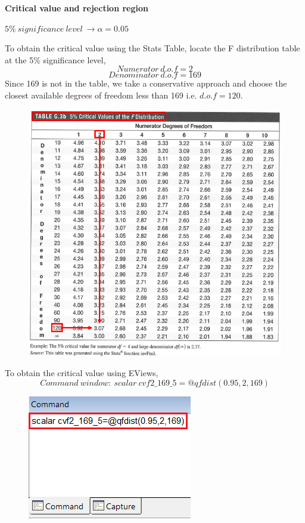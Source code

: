 \documentclass[12pt]{report}
\begin{document}
\justify \noindent \textbf{Critical value and rejection region}

\noindent $5\%\ significance\ level\ \to \alpha = 0.05$

\noindent To obtain the critical value using the Stats Table, locate the F distribution table at the 5\% significance level,
$$Numerator\ d.o.f = 2$$
$$Denominator\ d.o.f = 169$$
\noindent Since 169 is not in the table, we take a conservative approach and choose the closest available degrees of freedom less than 169 i.e. $d.o.f=120$. 
\begin{figure}[H]
	\centering
	\includegraphics{q1_19}
\end{figure}
\vspace{-\baselineskip}
\noindent To obtain the critical value using EViews,
$$Command\ window:\ scalar\ cvf2\_169\_5=@qfdist(0.95,2,169)$$
\begin{figure}[H]
	\centering
	\includegraphics{q1_20}
\end{figure}
\end{document}
